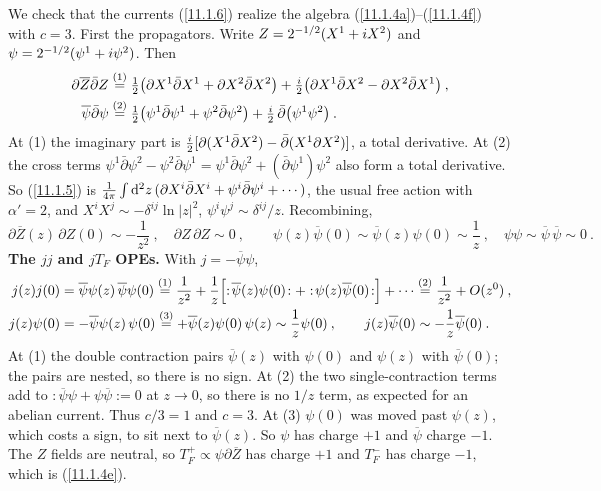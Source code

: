 \begin{tcolorbox}[breakable]
	\begin{remark}
		We check that the currents (\ref{11.1.6}) realize the algebra (\ref{11.1.4a})--(\ref{11.1.4f}) with $c=3$. First the propagators. Write $Z=2^{-1/2}(X^{1}+i X^{2})$ and $\psi=2^{-1/2}(\psi^{1}+i\psi^{2})$. Then
		\begin{align*}
			\partial\overline{Z}\bar{\partial}Z &\overset{(1)}{=} \tfrac{1}{2}\bigl(\partial X^{1}\bar{\partial}X^{1}+\partial X^{2}\bar{\partial}X^{2}\bigr)+\tfrac{i}{2}\bigl(\partial X^{1}\bar{\partial}X^{2}-\partial X^{2}\bar{\partial}X^{1}\bigr)\:, \\
			\overline{\psi}\bar{\partial}\psi &\overset{(2)}{=} \tfrac{1}{2}\bigl(\psi^{1}\bar{\partial}\psi^{1}+\psi^{2}\bar{\partial}\psi^{2}\bigr)+\tfrac{i}{2}\,\bar{\partial}\bigl(\psi^{1}\psi^{2}\bigr)\:.
		\end{align*}
		At (1) the imaginary part is $\tfrac{i}{2}[\partial(X^{1}\bar{\partial}X^{2})-\bar{\partial}(X^{1}\partial X^{2})]$, a total derivative. At (2) the cross terms $\psi^{1}\bar{\partial}\psi^{2}-\psi^{2}\bar{\partial}\psi^{1}=\psi^{1}\bar{\partial}\psi^{2}+(\bar{\partial}\psi^{1})\psi^{2}$ also form a total derivative. So (\ref{11.1.5}) is $\frac{1}{4\pi}\int\mathrm{d}^{2}z\,(\partial X^{i}\bar{\partial}X^{i}+\psi^{i}\bar{\partial}\psi^{i}+\cdots)$, the usual free action with $\alpha'=2$, and $X^{i}X^{j}\sim-\delta^{ij}\ln\lvert z\rvert^{2}$, $\psi^{i}\psi^{j}\sim\delta^{ij}/z$. Recombining,
		\begin{equation*}
			\partial\overline{Z}(z)\,\partial Z(0)\sim-\frac{1}{z^{2}}\:,\quad \partial Z\,\partial Z\sim 0\:,\qquad
			\psi(z)\overline{\psi}(0)\sim\overline{\psi}(z)\psi(0)\sim\frac{1}{z}\:,\quad \psi\psi\sim\overline{\psi}\,\overline{\psi}\sim0\:.
		\end{equation*}
		\textbf{The $jj$ and $jT_F$ OPEs.} With $j=-\overline{\psi}\psi$,
		\begin{align*}
			j(z)j(0)&=\overline{\psi}\psi(z)\,\overline{\psi}\psi(0)
			\overset{(1)}{=}\frac{1}{z^{2}}+\frac{1}{z}\Bigl[:\!\overline{\psi}(z)\psi(0)\!:+:\!\psi(z)\overline{\psi}(0)\!:\Bigr]+\cdots
			\overset{(2)}{=}\frac{1}{z^{2}}+O(z^{0})\:,\\
			j(z)\psi(0)&=-\overline{\psi}\psi(z)\,\psi(0)\overset{(3)}{=}+\overline{\psi}(z)\psi(0)\,\psi(z)\sim\frac{1}{z}\psi(0)\:,\qquad
			j(z)\overline{\psi}(0)\sim-\frac{1}{z}\overline{\psi}(0)\:.
		\end{align*}
		At (1) the double contraction pairs $\overline{\psi}(z)$ with $\psi(0)$ and $\psi(z)$ with $\overline{\psi}(0)$; the pairs are nested, so there is no sign. At (2) the two single-contraction terms add to $:\!\overline{\psi}\psi+\psi\overline{\psi}\!:=0$ at $z\to0$, so there is no $1/z$ term, as expected for an abelian current. Thus $c/3=1$ and $c=3$. At (3) $\psi(0)$ was moved past $\psi(z)$, which costs a sign, to sit next to $\overline{\psi}(z)$. So $\psi$ has charge $+1$ and $\overline{\psi}$ charge $-1$. The $Z$ fields are neutral, so $T_{F}^{+}\propto\psi\partial\overline{Z}$ has charge $+1$ and $T_{F}^{-}$ has charge $-1$, which is (\ref{11.1.4e}).


\end{remark}
\end{tcolorbox}
